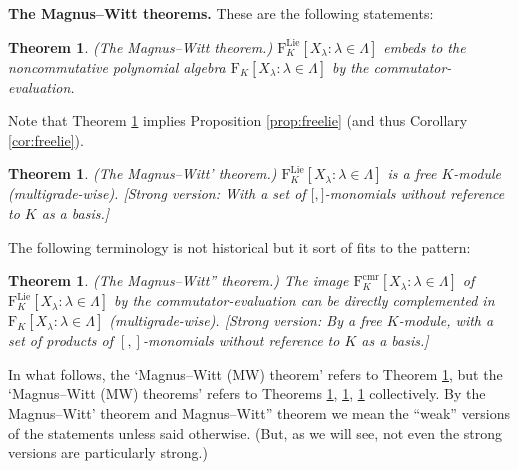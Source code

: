 \documentclass[11pt,a4paper]{amsart}
\newcommand{\plabel}[1]{ \label{#1}}
\newcommand{\snewpage}{}
\newcommand{\plabel}[1]{ \label{#1}\rlap{\smash{${}^{^{[#1]}}$}}}
\newcommand{\snewpage}{\newpage}
\newcommand{\plabel}[1]{ \label{#1}}
\newcommand{\snewpage}{}
\DeclareMathOperator{\Lie}{Lie}
\DeclareMathOperator{\cmr}{cmr}
\newcommand{\bo}{\boldsymbol}
\theoremstyle{definition}
\theoremstyle{plain}
\newtheorem{theorem}[point]{Theorem}
\begin{document}
\snewpage
\textbf{The Magnus--Witt theorems.} These are the following statements:
\begin{theorem}\plabel{prop:WMag}  (The Magnus--Witt theorem.)
$\mathrm F^{\Lie}_K[X_\lambda:\lambda\in\Lambda]$ embeds to the noncommutative polynomial algebra
 $\mathrm F_K[X_\lambda:\lambda\in\Lambda]$ by the commutator-evaluation.
\end{theorem}
Note that Theorem \ref{prop:WMag} implies Proposition \ref{prop:freelie} (and thus Corollary \ref{cor:freelie}).
\begin{theorem}\plabel{prop:CMag} (The Magnus--Witt' theorem.)
$\mathrm F^{\Lie}_K[X_\lambda:\lambda\in\Lambda]$ is a free $K$-module (multigrade-wise).
[Strong version: With a set of $\bo[,\bo]$-monomials  without reference to $K$ as a basis.]
\end{theorem}
The following terminology is not historical but it sort of fits to the pattern:
\begin{theorem}\plabel{prop:XCMag} (The Magnus--Witt'' theorem.)
The image $\mathrm F^{\cmr}_K[X_\lambda:\lambda\in\Lambda]$ of $\mathrm F^{\Lie}_K[X_\lambda:\lambda\in\Lambda]$
 by the commutator-evaluation can be directly complemented in $\mathrm F_K[X_\lambda:\lambda\in\Lambda]$ (multigrade-wise).
[Strong version: By a free $K$-module, with
 a set of products of $[,]$-monomials without reference to $K$ as a basis.]
\end{theorem}
In what follows, the `Magnus--Witt (MW) theorem' refers to Theorem \ref{prop:WMag}, but the
 `Magnus--Witt (MW) theorems' refers to Theorems \ref{prop:WMag}, \ref{prop:CMag}, \ref{prop:XCMag} collectively.
By the Magnus--Witt' theorem and Magnus--Witt'' theorem we mean the ``weak'' versions of the statements
 unless said otherwise.
(But, as we will see, not even the strong versions are particularly strong.)
\end{document}
